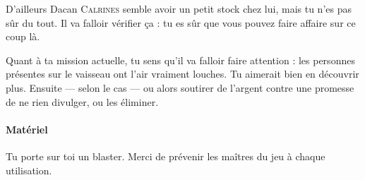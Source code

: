 \documentclass{article}
\begin{document}
{D’ailleurs Dacan \textsc{Calrines} semble avoir un petit stock chez lui, mais tu n’es pas sûr du tout.
Il va falloir vérifier ça : tu es sûr que vous pouvez faire affaire sur ce coup là.

Quant à ta mission actuelle, tu sens qu’il va falloir faire attention :
les personnes présentes sur le vaisseau ont l’air vraiment louches.
Tu aimerait bien en découvrir plus.
Ensuite — selon le cas — ou alors soutirer de l’argent contre une promesse de ne rien divulger, ou les éliminer.

\paragraph{Matériel}
{
Tu porte sur toi un blaster.
Merci de prévenir les maîtres du jeu à chaque utilisation.
}
}
\end{document}
